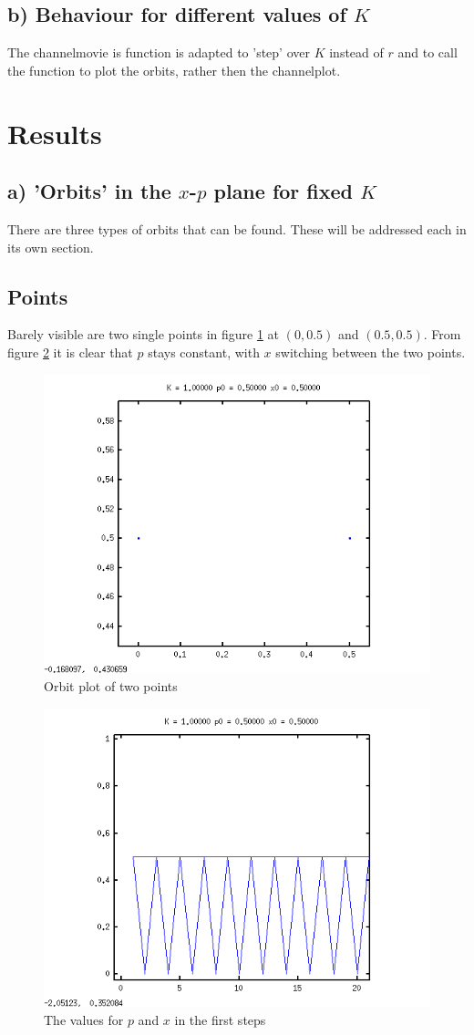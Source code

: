\documentclass{article}
\begin{document}
\subsection*{b) Behaviour for different values of $K$}
The channelmovie is function is adapted to 'step' over $K$ instead of $r$ and to call the function to plot the orbits, rather then the channelplot.

\section{Results}
\subsection*{a) 'Orbits' in the $x$-$p$ plane for fixed $K$}
There are three types of orbits that can be found. These will be addressed each in its own section.
\subsection*{Points}
Barely visible are two single points in figure \ref{pointorbit} at $(0,0.5)$ and $(0.5,0.5)$. From figure \ref{pointval} it is clear that $p$ stays constant, with $x$ switching between the two points.
\begin{figure}[H]
\centering
\includegraphics[width=.8\textwidth]{pointorbit.png}
\caption{Orbit plot of two points}
\label{pointorbit}
\end{figure}
\begin{figure}[H]
\centering
\includegraphics[width=.8\textwidth]{pointsvalues.png}
\caption{The values for $p$ and $x$ in the first steps }
\label{pointval}
\end{figure}
\end{document}
